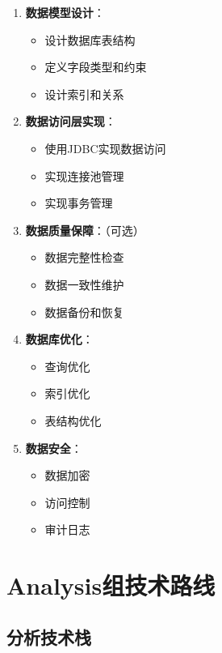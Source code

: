 \documentclass[a4paper,12pt]{article}
\begin{document}
\begin{enumerate}
  \item \textbf{数据模型设计}：
    \begin{itemize}
      \item 设计数据库表结构
      \item 定义字段类型和约束
      \item 设计索引和关系
    \end{itemize}
  
  \item \textbf{数据访问层实现}：
    \begin{itemize}
      \item 使用JDBC实现数据访问
      \item 实现连接池管理
      \item 实现事务管理
    \end{itemize}
  
  \item \textbf{数据质量保障}：（可选）
    \begin{itemize}
      \item 数据完整性检查
      \item 数据一致性维护
      \item 数据备份和恢复
    \end{itemize}
  
  \item \textbf{数据库优化}：
    \begin{itemize}
      \item 查询优化
      \item 索引优化
      \item 表结构优化
    \end{itemize}
  
  \item \textbf{数据安全}：
    \begin{itemize}
      \item 数据加密
      \item 访问控制
      \item 审计日志
    \end{itemize}
\end{enumerate}

\section{Analysis组技术路线}

\subsection{分析技术栈}
\end{document}
